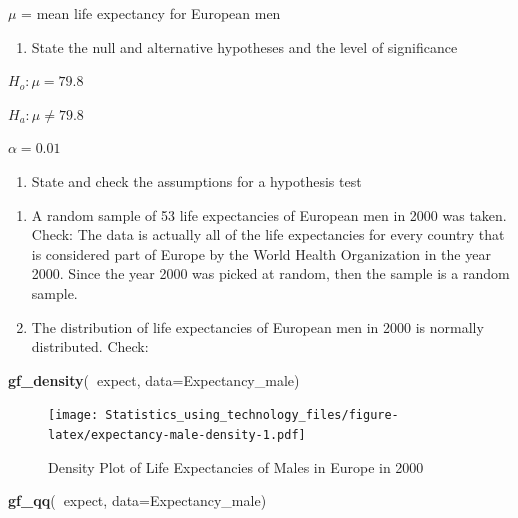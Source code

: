 \documentclass[]{book}
\newenvironment{Shaded}{\begin{snugshade}}{\end{snugshade}}
\newcommand{\DataTypeTok}[1]{\textcolor[rgb]{0.13,0.29,0.53}{#1}}
\newcommand{\KeywordTok}[1]{\textcolor[rgb]{0.13,0.29,0.53}{\textbf{#1}}}
\newcommand{\NormalTok}[1]{#1}
\newcommand{\OperatorTok}[1]{\textcolor[rgb]{0.81,0.36,0.00}{\textbf{#1}}}
\providecommand{\tightlist}{%
  \setlength{\itemsep}{0pt}\setlength{\parskip}{0pt}}
\begin{document}
\(\mu\) = mean life expectancy for European men

\begin{enumerate}
\def\labelenumi{\arabic{enumi}.}
\setcounter{enumi}{1}
\tightlist
\item
  State the null and alternative hypotheses and the level of significance
\end{enumerate}

\(H_o:\mu=79.8\)

\(H_a:\mu\ne79.8\)

\(\alpha=0.01\)

\begin{enumerate}
\def\labelenumi{\arabic{enumi}.}
\setcounter{enumi}{2}
\tightlist
\item
  State and check the assumptions for a hypothesis test
\end{enumerate}

\begin{enumerate}
\def\labelenumi{\alph{enumi}.}
\item
  A random sample of 53 life expectancies of European men in 2000 was taken. Check: The data is actually all of the life expectancies for every country that is considered part of Europe by the World Health Organization in the year 2000. Since the year 2000 was picked at random, then the sample is a random sample.
\item
  The distribution of life expectancies of European men in 2000 is normally distributed. Check:
\end{enumerate}



\begin{Shaded}
\begin{Highlighting}[]
\KeywordTok{gf_density}\NormalTok{(}\OperatorTok{~}\NormalTok{expect, }\DataTypeTok{data=}\NormalTok{Expectancy_male)}
\end{Highlighting}
\end{Shaded}

\begin{figure}
\centering
\texttt{[image: Statistics\_using\_technology\_files/figure-latex/expectancy-male-density-1.pdf]}
\caption{\label{fig:expectancy-male-density}Density Plot of Life Expectancies of Males in Europe in 2000}
\end{figure}



\begin{Shaded}
\begin{Highlighting}[]
\KeywordTok{gf_qq}\NormalTok{(}\OperatorTok{~}\NormalTok{expect, }\DataTypeTok{data=}\NormalTok{Expectancy_male)}
\end{Highlighting}
\end{Shaded}
\end{document}
